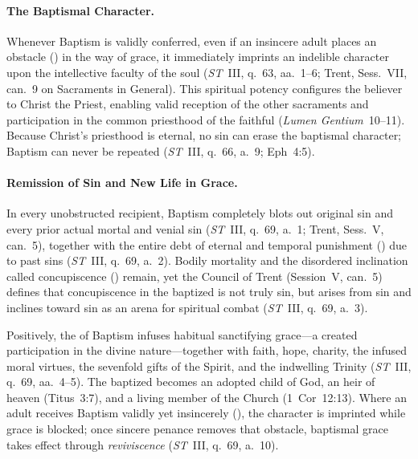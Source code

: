 \paragraph{The Baptismal Character.}
Whenever Baptism is validly conferred, even if an insincere adult places an obstacle () in the way of grace, it immediately imprints an indelible character upon the intellective faculty of the soul (\emph{ST}~III, q.~63, aa.~1--6; Trent, Sess.~VII, can.~9 on Sacraments in General). This spiritual potency configures the believer to Christ the Priest, enabling valid reception of the other sacraments and participation in the common priesthood of the faithful (\emph{Lumen Gentium}~10--11). Because Christ's priesthood is eternal, no sin can erase the baptismal character; Baptism can never be repeated (\emph{ST}~III, q.~66, a.~9; Eph~4:5).

\paragraph{Remission of Sin and New Life in Grace.}
In every unobstructed recipient, Baptism completely blots out original sin and every prior actual mortal and venial sin (\emph{ST}~III, q.~69, a.~1; Trent, Sess.~V, can.~5), together with the entire debt of eternal and temporal punishment () due to past sins (\emph{ST}~III, q.~69, a.~2). Bodily mortality and the disordered inclination called concupiscence () remain, yet the Council of Trent (Session~V, can.~5) defines that concupiscence in the baptized is not truly sin, but arises from sin and inclines toward sin as an arena for spiritual combat (\emph{ST}~III, q.~69, a.~3).

Positively, the  of Baptism infuses habitual sanctifying grace---a created participation in the divine nature---together with faith, hope, charity, the infused moral virtues, the sevenfold gifts of the Spirit, and the indwelling Trinity (\emph{ST}~III, q.~69, aa.~4--5). The baptized becomes an adopted child of God, an heir of heaven (Titus~3:7), and a living member of the Church (1~Cor~12:13). Where an adult receives Baptism validly yet insincerely (), the character is imprinted while grace is blocked; once sincere penance removes that obstacle, baptismal grace takes effect through \emph{reviviscence} (\emph{ST}~III, q.~69, a.~10).

